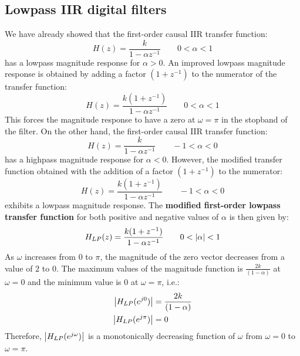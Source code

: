 \documentclass[../../main/main.tex]{subfiles}
\begin{document}
\subsection{Lowpass IIR digital filters}
We have already showed that the first-order causal IIR transfer function:
\begin{equation}
    H(z)
    =
    \frac{k}{1 - \alpha z^{-1}}
    \qquad
    0 < \alpha < 1
    \label{eq:L19_S33_1}
\end{equation}
has a lowpass magnitude response for \( \alpha > 0 \).
An improved lowpass magnitude response is obtained by adding a factor \( (1+z^{-1}) \) to the numerator of the transfer function:
\begin{equation}
    H(z)
    =
    \frac{k(1+z^{-1})}{1 - \alpha z^{-1}}
    \qquad
    0 < \alpha < 1
    \label{eq:L19_S34_1}
\end{equation}
This forces the magnitude response to have a zero at \( \omega = \pi \) in the stopband of the filter. On the other hand, the first-order causal IIR transfer function:
\begin{equation}
    H(z)
    =
    \frac{k}{1 - \alpha z^{-1}}
    \qquad
    -1 < \alpha < 0
    \label{eq:L19_S35_1}
\end{equation}
has a highpass magnitude response for \( \alpha < 0 \). However, the modified transfer function obtained with the addition of a factor \( (1+z^{-1}) \) to the numerator:
\begin{equation}
    H(z)
    =
    \frac{k(1+z^{-1})}{1 - \alpha z^{-1}}
    \qquad
    -1 < \alpha < 0
    \label{eq:L19_S36_1}
\end{equation}
exhibits a lowpass magnitude response.
The \textbf{modified first-order lowpass transfer function} for both positive and negative values of \( \alpha \) is then given by:
\begin{equation}
    H_{LP}(z)
    =
    \frac{k(1+z^{-1})}{1 - \alpha z^{-1}}
    \qquad
    0 < \abs{\alpha} < 1
    \label{eq:L19_S37_1}
\end{equation}
As \( \omega \) increases from \( 0 \) to \( \pi \), the magnitude of the zero vector decreases from a value of \( 2 \) to \( 0 \).
The maximum values of the magnitude function is \( \frac{2k}{(1-\alpha)} \) at \( \omega = 0 \) and the minimum value is \( 0 \) at \( \omega = \pi \), i.e.:
\begin{align}
    \abs{H_{LP}(e^{j0})} &= \frac{2k}{(1-\alpha)}   \\
    \abs{H_{LP}(e^{j\pi})} &= 0
\end{align}
Therefore, \( \abs{H_{LP}(e^{j\omega})} \) is a monotonically decreasing function of \( \omega \) from \( \omega = 0 \) to \( \omega = \pi \).
\end{document}
